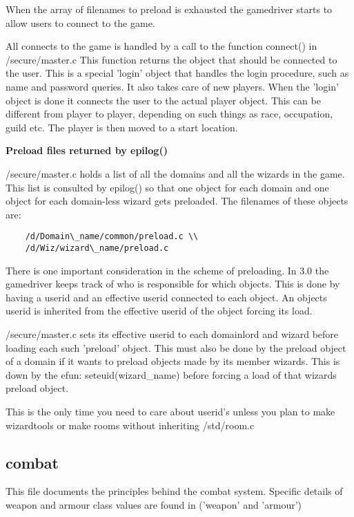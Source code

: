 When the array of filenames to preload is exhausted the gamedriver starts to
allow users to connect to the game.

All connects to the game is handled by a call to the function connect() in
/secure/master.c This function returns the object that should be connected
to the user. This is a special 'login' object that handles the login procedure,
such as name and password queries. It also takes care of new players. When
the 'login' object is done it connects the user to the actual player object.
This can be different from player to player, depending on such things as race,
occupation, guild etc. The player is then moved to a start location.

{\bf Preload files returned by epilog()}


/secure/master.c holds a list of all the domains and all the wizards in the
game. This list is consulted by epilog() so that one object for each domain
and one object for each domain-less wizard gets preloaded. The filenames of 
these objects are:

\begin{verbatim}
    /d/Domain\_name/common/preload.c \\
    /d/Wiz/wizard\_name/preload.c
\end{verbatim}

There is one important consideration in the scheme of preloading. In 3.0 the
gamedriver keeps track of who is responsible for which objects. This is done
by having a userid and an effective userid connected to each object. An objects
userid is inherited from the effective userid of the object forcing its load.

/secure/master.c sets its effective userid to each domainlord and wizard
before loading each such 'preload' object. This must also be done by the
preload object of a domain if it wants to preload objects made by its
member wizards. This is down by the efun: seteuid(wizard\_name) before forcing
a load of that wizards preload object.

This is the only time you need to care about userid's unless you plan to make
wizardtools or make rooms without inheriting /std/room.c



\subsection{combat}

This file documents the principles behind the combat system. Specific
details of weapon and armour class values are found in ('weapon' and 'armour')

